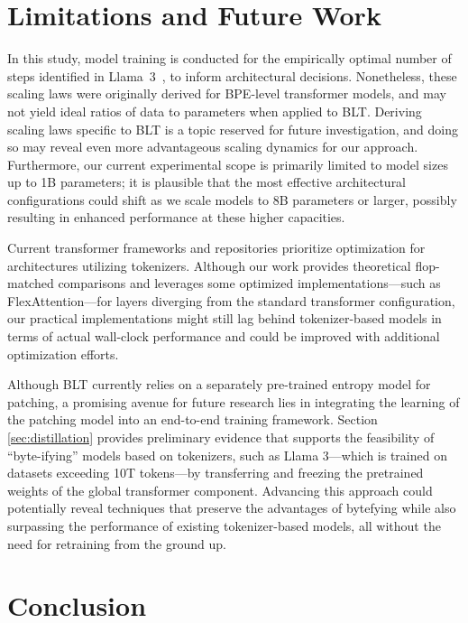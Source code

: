 \section{Limitations and Future Work}

In this study, model training is conducted for the empirically optimal number of steps identified in Llama~3~\citep{dubey2024llama}, to inform architectural decisions. Nonetheless, these scaling laws were originally derived for BPE-level transformer models, and may not yield ideal ratios of data to parameters when applied to {\textsc BLT}. Deriving scaling laws specific to {\textsc BLT} is a topic reserved for future investigation, and doing so may reveal even more advantageous scaling dynamics for our approach. Furthermore, our current experimental scope is primarily limited to model sizes up to 1B parameters; it is plausible that the most effective architectural configurations could shift as we scale models to 8B parameters or larger, possibly resulting in enhanced performance at these higher capacities.

Current transformer frameworks and repositories prioritize optimization for architectures utilizing tokenizers. Although our work provides theoretical flop-matched comparisons and leverages some optimized implementations—such as FlexAttention—for layers diverging from the standard transformer configuration, our practical implementations might still lag behind tokenizer-based models in terms of actual wall-clock performance and could be improved with additional optimization efforts.

Although {\textsc BLT} currently relies on a separately pre-trained entropy model for patching, a promising avenue for future research lies in integrating the learning of the patching model into an end-to-end training framework. Section \ref{sec:distillation} provides preliminary evidence that supports the feasibility of “byte-ifying” models based on tokenizers, such as Llama 3—which is trained on datasets exceeding 10T tokens—by transferring and freezing the pretrained weights of the global transformer component. Advancing this approach could potentially reveal techniques that preserve the advantages of bytefying while also surpassing the performance of existing tokenizer-based models, all without the need for retraining from the ground up.

\section{Conclusion}
\label{section:conclusion}

